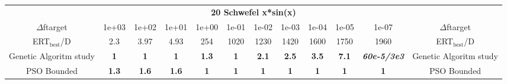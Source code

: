 \begin{tabular}{cccccccccccc}
 & \multicolumn{10}{c}{{\normalsize \textbf{20 Schwefel x*sin(x)}}}\\
$\Delta$ftarget& 1e+03& 1e+02& 1e+01& 1e+00& 1e-01& 1e-02& 1e-03& 1e-04& 1e-05& 1e-07 & $\Delta$ftarget \\
ERT$_{\textrm{best}}$/D& 2.3& 3.97& 4.93& 254& 1020& 1230& 1420& 1600& 1750& 1960 & ERT$_{\textrm{best}}$/D \\
\hline
Genetic Algoritm study & \textbf{1} & \textbf{1} & \textbf{1} & \textbf{1.3} & \textbf{1} & \textbf{2.1} & \textbf{2.5} & \textbf{3.5} & \textbf{7.1} & \textbf{\textit{60e-5}\textit{/3e3}} & Genetic Algoritm study \cite{add_an_entry_for_Genetic Algoritm study_in_bbob.bib}\\
PSO Bounded & \textbf{1.3} & \textbf{1.6} & \textbf{1.6} & \textbf{1} & \textbf{1} & \textbf{1} & \textbf{1} & \textbf{1} & \textbf{1} & \textbf{1} & PSO Bounded \cite{add_an_entry_for_PSO Bounded_in_bbob.bib}
\end{tabular}
